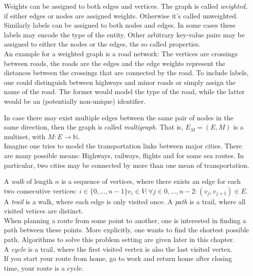             Weights can be assigned to both edges and vertices. The graph is called \textit{weighted}, if either edges or nodes are assigned weights. Otherwise it's called unweighted.
            Similarly labels can be assigned to both nodes and edges. In some cases these labels may encode the type of the entity.
            Other arbitrary key-value pairs may be assigned to either the nodes or the edges, the so called properties. \\
            An example for a weighted graph is a road network: The vertices are crossings between roads, the roads are the edges and the edge weights represent the distances between the crossings that are connected by the road.
            To include labels, one could distinguish between highways and minor roads or simply assign the name of the road. The former would model the type of the road, while the latter would be an (potentially non-unique) identifier.
            
            In case there may exist multiple edges between the same pair of nodes in the same direction, then the graph is called \textit{multigraph}. That is, $E_M = (E, M)$ is a multiset, with $M: E \rightarrow \mathbb{N}$. \\
            Imagine one tries to model the transportation links between major cities. There are many possible means: Highways, railways, flights and for some sea routes. In particular, two cities may be connected by more than one mean of transportation.
            
            A \textit{walk} of length $n$ is a sequence of vertices, where there exists an edge for each two consecutive vertices: $i \in \{0, \dots, n-1\} v_i \in V: \forall j \in {0, \dots, n-2}: (v_j,v_{j+1}) \in E$. A \textit{trail} is a walk, where each edge is only visited once. A \textit{path} is a trail, where all visited vetices are distinct.\\
            When planning a route from some point to another, one is interested in finding a path between these points. More explicitly, one wants to find the shortest possible path. Algorithms to solve this problem setting are given later in this chapter. \\
            
            A \textit{cycle} is a trail, where the first visited vertex is also the last visited vertex. \\
            If you start your route from home, go to work and return home after closing time, your route is a cycle.
            
